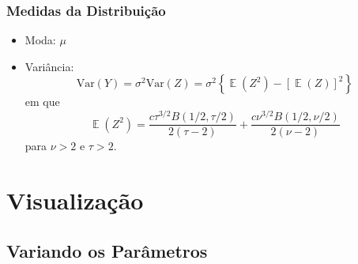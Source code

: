 \documentclass[13pt, aspectratio=169]{beamer}
\DeclareMathOperator{\EX}{\mathbb{E}}%
\begin{document}
\begin{frame}
    \frametitle{Medidas da Distribuição}
    \begin{itemize}
        \item Moda: $\mu$
        \item Variância:
            \begin{equation*}
                \text{Var}(Y) = \sigma^2 \text{Var}(Z) = \sigma^2 \left\{\EX(Z^2) - [\EX(Z)]^2 \right\}
            \end{equation*}
            \pause
            em que \begin{equation*}
                \EX(Z^2) = \frac{c \tau^{3/2} B(1/2, \tau/2)}{2(\tau -2)} + \frac{c \nu^{3/2} B(1/2, \nu/2)}{2(\nu -2)}
            \end{equation*}
            para $\nu > 2$  e $\tau > 2$.
    \end{itemize}   
\end{frame}

\section{Visualização}
\subsection{Variando os Parâmetros}
\end{document}
